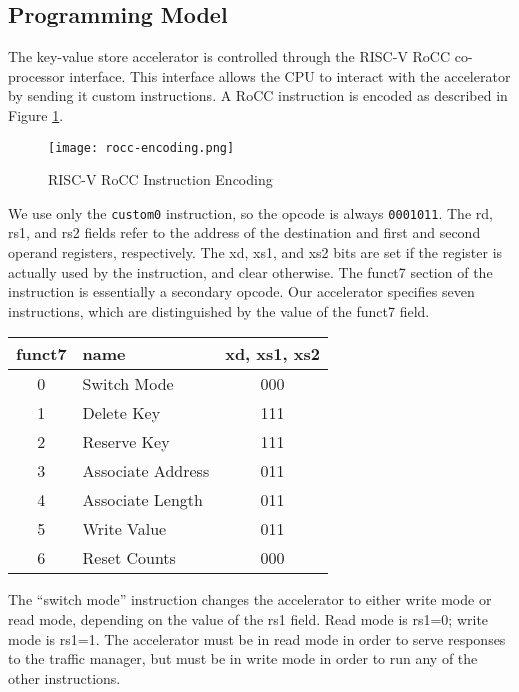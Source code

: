 \subsection{Programming Model}

The key-value store accelerator is controlled through the RISC-V RoCC
co-processor interface. This interface allows the CPU to interact with the
accelerator by sending it custom instructions. A RoCC instruction is encoded
as described in Figure \ref{fig:roccencoding}.

\begin{figure}[h]
    \begin{center}
\texttt{[image: rocc-encoding.png]}
\caption{RISC-V RoCC Instruction Encoding}
\label{fig:roccencoding}
\end{center}
\end{figure}


We use only the \texttt{custom0} instruction, so the opcode is always
\texttt{0001011}.
The rd, rs1, and rs2 fields refer to the address of the destination and
first and second operand registers, respectively. The xd, xs1, and xs2 bits
are set if the register is actually used by the instruction, and clear
otherwise. The funct7 section of the instruction is essentially a secondary
opcode. Our accelerator specifies seven instructions, which are distinguished
by the value of the funct7 field.

\begin{center}
\begin{tabular}{|c|l|c|}
    \hline
    funct7 & name & xd, xs1, xs2 \\
    \hline
    0 & Switch Mode & 000 \\
    1 & Delete Key & 111 \\
    2 & Reserve Key & 111 \\
    3 & Associate Address & 011 \\
    4 & Associate Length & 011 \\
    5 & Write Value & 011 \\
    6 & Reset Counts & 000 \\
    \hline
\end{tabular}
\end{center}

The ``switch mode'' instruction changes the accelerator to either write mode or
read mode, depending on the value of the rs1 field. Read mode is rs1=0;
write mode is rs1=1. The accelerator must be in read mode in order to serve
responses to the traffic manager, but must be in write mode in order to run
any of the other instructions.

